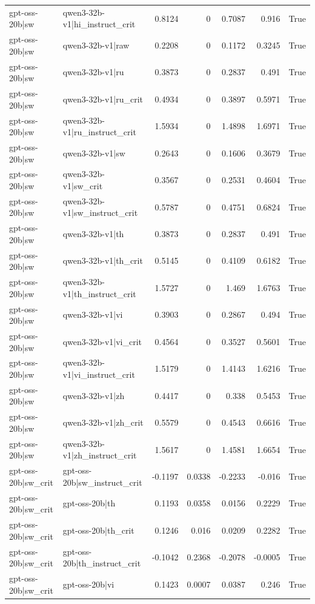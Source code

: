 \begin{table}
\begin{tabular}{l l r r r r l}
gpt-oss-20b|sw & qwen3-32b-v1|hi_instruct_crit & 0.8124 & 0 & 0.7087 & 0.916 & True \\
gpt-oss-20b|sw & qwen3-32b-v1|raw & 0.2208 & 0 & 0.1172 & 0.3245 & True \\
gpt-oss-20b|sw & qwen3-32b-v1|ru & 0.3873 & 0 & 0.2837 & 0.491 & True \\
gpt-oss-20b|sw & qwen3-32b-v1|ru_crit & 0.4934 & 0 & 0.3897 & 0.5971 & True \\
gpt-oss-20b|sw & qwen3-32b-v1|ru_instruct_crit & 1.5934 & 0 & 1.4898 & 1.6971 & True \\
gpt-oss-20b|sw & qwen3-32b-v1|sw & 0.2643 & 0 & 0.1606 & 0.3679 & True \\
gpt-oss-20b|sw & qwen3-32b-v1|sw_crit & 0.3567 & 0 & 0.2531 & 0.4604 & True \\
gpt-oss-20b|sw & qwen3-32b-v1|sw_instruct_crit & 0.5787 & 0 & 0.4751 & 0.6824 & True \\
gpt-oss-20b|sw & qwen3-32b-v1|th & 0.3873 & 0 & 0.2837 & 0.491 & True \\
gpt-oss-20b|sw & qwen3-32b-v1|th_crit & 0.5145 & 0 & 0.4109 & 0.6182 & True \\
gpt-oss-20b|sw & qwen3-32b-v1|th_instruct_crit & 1.5727 & 0 & 1.469 & 1.6763 & True \\
gpt-oss-20b|sw & qwen3-32b-v1|vi & 0.3903 & 0 & 0.2867 & 0.494 & True \\
gpt-oss-20b|sw & qwen3-32b-v1|vi_crit & 0.4564 & 0 & 0.3527 & 0.5601 & True \\
gpt-oss-20b|sw & qwen3-32b-v1|vi_instruct_crit & 1.5179 & 0 & 1.4143 & 1.6216 & True \\
gpt-oss-20b|sw & qwen3-32b-v1|zh & 0.4417 & 0 & 0.338 & 0.5453 & True \\
gpt-oss-20b|sw & qwen3-32b-v1|zh_crit & 0.5579 & 0 & 0.4543 & 0.6616 & True \\
gpt-oss-20b|sw & qwen3-32b-v1|zh_instruct_crit & 1.5617 & 0 & 1.4581 & 1.6654 & True \\
gpt-oss-20b|sw_crit & gpt-oss-20b|sw_instruct_crit & -0.1197 & 0.0338 & -0.2233 & -0.016 & True \\
gpt-oss-20b|sw_crit & gpt-oss-20b|th & 0.1193 & 0.0358 & 0.0156 & 0.2229 & True \\
gpt-oss-20b|sw_crit & gpt-oss-20b|th_crit & 0.1246 & 0.016 & 0.0209 & 0.2282 & True \\
gpt-oss-20b|sw_crit & gpt-oss-20b|th_instruct_crit & -0.1042 & 0.2368 & -0.2078 & -0.0005 & True \\
gpt-oss-20b|sw_crit & gpt-oss-20b|vi & 0.1423 & 0.0007 & 0.0387 & 0.246 & True \\

\end{tabular}
\end{table}
